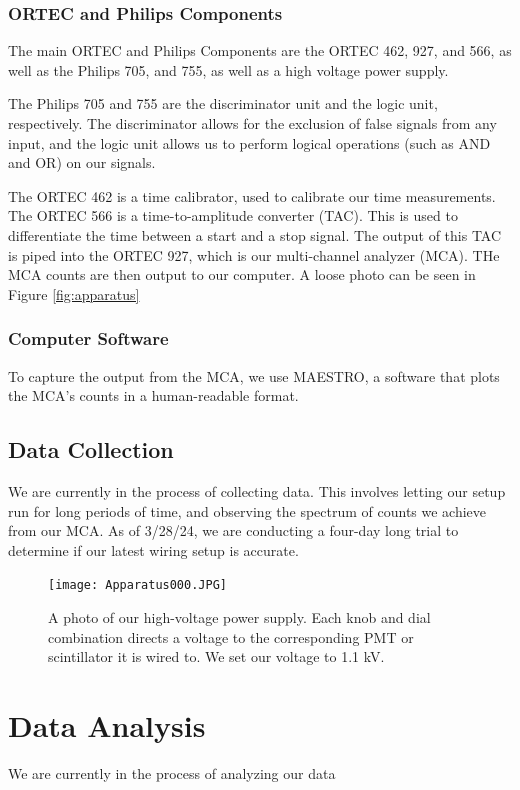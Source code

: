 \documentclass[10pt,letterpaper,onecolumn]{article}
\begin{document}
\subsubsection{ORTEC and Philips Components}
The main ORTEC and Philips Components are the ORTEC 462, 927, and 566, as well as the Philips 705, and 755, as well as a high voltage power supply.

The Philips 705 and 755 are the discriminator unit and the logic unit, respectively. The discriminator allows for the exclusion of false signals from any input, and the logic unit allows us to perform logical operations (such as AND and OR) on our signals.

The ORTEC 462 is a time calibrator, used to calibrate our time measurements. The ORTEC 566 is a time-to-amplitude converter (TAC). This is used to differentiate the time between a start and a stop signal. The output of this TAC is piped into the ORTEC 927, which is our multi-channel analyzer (MCA). THe MCA counts are then output to our computer. A loose photo can be seen in Figure \ref{fig:apparatus}
\subsubsection{Computer Software}
To capture the output from the MCA, we use MAESTRO, a software that plots the MCA's counts in a human-readable format. 
\subsection{Data Collection}
We are currently in the process of collecting data. This involves letting our setup run for long periods of time, and observing the spectrum of counts we achieve from our MCA. As of 3/28/24, we are conducting a four-day long trial to determine if our latest wiring setup is accurate.
\begin{figure}[hbt!]
    \begin{center}
        {{\texttt{[image: Apparatus000.JPG]} }}%
        \caption{A photo of our high-voltage power supply. Each knob and dial combination directs a voltage to the corresponding PMT or scintillator it is wired to. We set our voltage to 1.1 kV.}%
        \label{fig:psu}%
    \end{center}
\end{figure}
\section{Data Analysis}
We are currently in the process of analyzing our data
\end{document}
